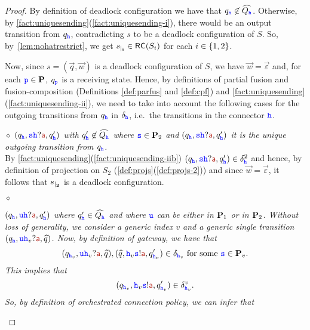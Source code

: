 \begin{proof}
By definition of deadlock configuration we have that
$q_{{\mathtt{\color{blue}{ {h}}}}}\not\in\widehat{Q_{{\mathtt{\color{blue}{ {h}}}}}}$.
Otherwise, by  \cref{fact:uniquesending}(\ref{fact:uniquesending-i}), 
there would be an output transition from $q_{{\mathtt{\color{blue}{ {h}}}}}$, contradicting $s$ to be a deadlock configuration of $S$.
So, by~\cref{lem:nohatrestrict}, we get ${s}_{\mid_{\mathbf{i}}}\in \mathsf{RC}(S_i)$ for each $i\in \{1,2\}$.

Now, since $s= (\vec{q},\vec{w})$ is a deadlock configuration of $S$, we have $\vec{w}=\vec{\varepsilon}$ and, for each ${\mathtt{\color{blue}{ {p}}}}\in\mathbf{P}$, $q_{\mathtt{\color{blue}{ {p}}}}$  is a receiving state.
Hence, by definitions of  partial fusion and fusion-composition 
(Definitions \ref{def:parfus} and \ref{def:cpf}) and \cref{fact:uniquesending}(\ref{fact:uniquesending-ii}),
we need  to 
take into account the following cases for the outgoing transitions from $q_{{\mathtt{\color{blue}{ {h}}}}}$  in 
$\delta_{{\mathtt{\color{blue}{ {h}}}}}$, i.e.\ the transitions in the connector ${\mathtt{\color{blue}{ {h}}}}$.

\begin{description}  
  \item
\underline{$\diamond$} 
{\em  $(q_{\HH},\tts{\HH}?\msg[a],q'_\hh)$ with $q'_{\mathtt{\color{blue}{ {h}}}}\not\in\widehat{Q_{\mathtt{\color{blue}{ {h}}}}}$ 
where ${\mathtt{\color{blue}{ {s}}}}\in\mathbf{P}_2$ and $(q_{\HH},\tts{\HH}?\msg[a],q'_\hh)$ it is the unique  
outgoing transition from $q_{\mathtt{\color{blue}{ {h}}}}$.}\\
 By \cref{fact:uniquesending}(\ref{fact:uniquesending-iib})
 $(q_{\HH},\tts{\HH}?\msg[a],q'_\hh)\in\delta^2_\hh$ and hence, by definition of projection
 on $S_2$ (\cref{def:projs}(\ref{def:projs-2})) and since $\vec{w}=\vec{\varepsilon}$,
 it follows that ${s}_{\mid_{\mathbf{2}}}$ is a deadlock configuration.
  

\item
\underline{$\diamond$}
{\em  $(q_{\HH},\ttu\HH?\msg[a],q'_\hh)$ where $q'_{\mathtt{\color{blue}{ {h}}}}\in\widehat{Q_{\mathtt{\color{blue}{ {h}}}}}$
and where ${\mathtt{\color{blue}{ {u}}}}$ can be either in $\mathbf{P}_1$ or in $\mathbf{P}_2$.
Without loss of generality, we consider a 
generic index $v$ and a generic single transition $(q_{\HH},\ttu{\HH_v}?\msg[a],\widehat{q})$.
Now, by definition of gateway, we have that
$$(q_{\HH_v},\ttu{\HH_v}?\msg[a],\widehat{q}),(\widehat{q},\HH_v{\tts}!\msg[a],q'_{\HH_v})\in \delta_{\HH_v} \text{ for some } \tts\in\roles_v.$$
This implies that
$$(q_{\HH_v},\HH_v{\tts}!\msg[a],q'_{\HH_v})\in \delta^v_{\HH_v}.$$
So, by definition of orchestrated connection policy, we can infer that 

}
\end{description}
\end{proof}
